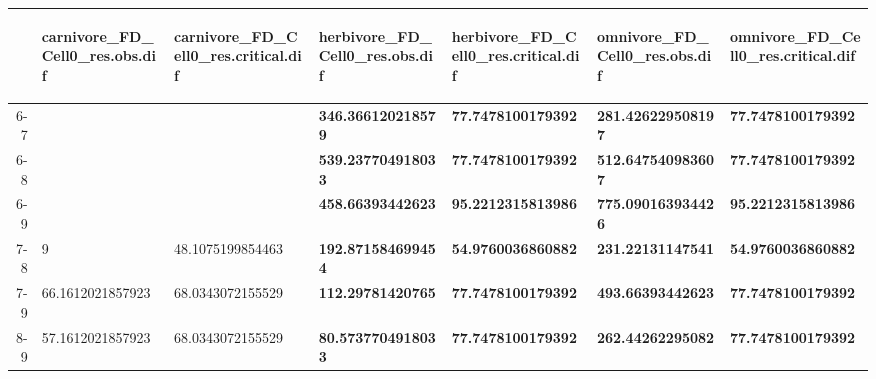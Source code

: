 \begin{table}[ht]
\centering
\begin{tabular}{rllllll}
  \toprule
 & \begin{sideways} carnivore_FD_Cell0_res.obs.dif \end{sideways} & \begin{sideways} carnivore_FD_Cell0_res.critical.dif \end{sideways} & \begin{sideways} herbivore_FD_Cell0_res.obs.dif \end{sideways} & \begin{sideways} herbivore_FD_Cell0_res.critical.dif \end{sideways} & \begin{sideways} omnivore_FD_Cell0_res.obs.dif \end{sideways} & \begin{sideways} omnivore_FD_Cell0_res.critical.dif \end{sideways} \\ 
  \midrule
6-7 &  &  & \textbf{346.366120218579} & \textbf{77.7478100179392} & \textbf{281.426229508197} & \textbf{77.7478100179392} \\ 
  6-8 &  &  & \textbf{539.237704918033} & \textbf{77.7478100179392} & \textbf{512.647540983607} & \textbf{77.7478100179392} \\ 
  6-9 &  &  & \textbf{458.66393442623} & \textbf{95.2212315813986} & \textbf{775.090163934426} & \textbf{95.2212315813986} \\ 
  7-8 & 9 & 48.1075199854463 & \textbf{192.871584699454} & \textbf{54.9760036860882} & \textbf{231.22131147541} & \textbf{54.9760036860882} \\ 
  7-9 & 66.1612021857923 & 68.0343072155529 & \textbf{112.29781420765} & \textbf{77.7478100179392} & \textbf{493.66393442623} & \textbf{77.7478100179392} \\ 
  8-9 & 57.1612021857923 & 68.0343072155529 & \textbf{80.5737704918033} & \textbf{77.7478100179392} & \textbf{262.44262295082} & \textbf{77.7478100179392} \\ 
   \bottomrule
\end{tabular}
\end{table}
